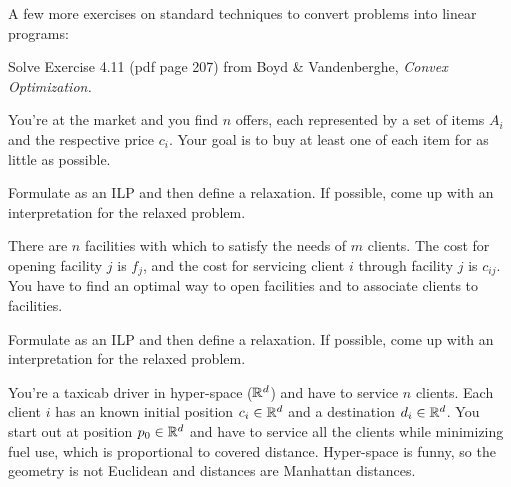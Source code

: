 

\renewcommand{\course}{Optimization}
\renewcommand{\coursepicture}{optim}
\renewcommand{\coursedate}{Summer 2015}
\renewcommand{\exnum}{8}

\exercises



A few more exercises on standard techniques to convert problems into linear programs:

Solve Exercise 4.11 (pdf page 207) from  Boyd \& Vandenberghe,
\emph{Convex Optimization.}



You're at the market and you find $n$ offers, each represented by a set of
items $A_i$ and the respective price $c_i$. Your goal is to buy at least one of
each item for as little as possible.

Formulate as an ILP and then define a relaxation. If possible, come up with an
interpretation for the relaxed problem.



There are $n$ facilities with which to satisfy the needs of $m$ clients.  The
cost for opening facility $j$ is $f_j$, and the cost for servicing client $i$
through facility $j$ is $c_{ij}$.  You have to find an optimal way to open
facilities and to associate clients to facilities.

Formulate as an ILP and then define a relaxation. If possible, come up with an
interpretation for the relaxed problem.



You're a taxicab driver in hyper-space (${\mathbb{R}}^d$) and have to service $n$
clients.  Each client $i$ has an known initial position $c_i\in{\mathbb{R}}^d$ and a
destination $d_i\in{\mathbb{R}}^d$.  You start out at position $p_0\in{\mathbb{R}}^d$ and have
to service all the clients while minimizing fuel use, which is proportional to
covered distance.  Hyper-space is funny, so the geometry is not Euclidean and
distances are Manhattan distances.

